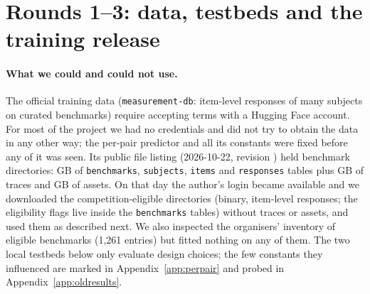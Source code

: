 \documentclass{article}
\begin{document}
\section{Rounds 1--3: data, testbeds and the training release}
\label{app:olddata}


\paragraph{What we could and could not use.} The official training data (\texttt{measurement-db}: item-level responses of many subjects on curated benchmarks) require accepting terms with a Hugging Face account. For most of the project we had no credentials and did not try to obtain the data in any other way; the per-pair predictor and all its constants were fixed before any of it was seen. Its public file listing (2026-10-22, revision \texttt{\MdbRevisionShort}) held \MdbNDirs{} benchmark directories: \MdbCoreGb{} GB of \texttt{benchmarks}, \texttt{subjects}, \texttt{items} and \texttt{responses} tables plus \MdbTracesGb{} GB of traces and \MdbAssetsGb{} GB of assets. On that day the author's login became available and we downloaded the \FitNEligible{} competition-eligible directories (binary, item-level responses; the eligibility flags live inside the \texttt{benchmarks} tables) without traces or assets, and used them as described next. We also inspected the organisers' inventory of eligible benchmarks (1,261 entries) but fitted nothing on any of them. The two local testbeds below only evaluate design choices; the few constants they influenced are marked in Appendix~\ref{app:perpair} and probed in Appendix~\ref{app:oldresults}.
\end{document}
